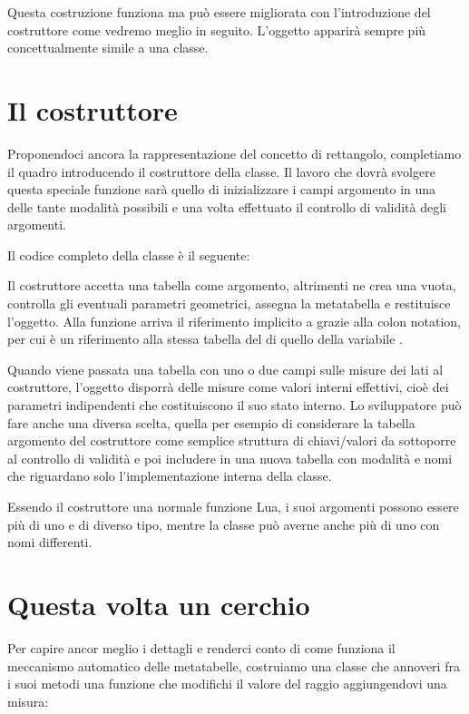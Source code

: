 Questa costruzione funziona ma può essere migliorata con l'introduzione del
costruttore come vedremo meglio in seguito. L'oggetto  apparirà
sempre più concettualmente simile a una classe.


\section{Il costruttore}
\label{iiSecCostruttore}

Proponendoci ancora la rappresentazione del concetto di rettangolo, completiamo
il quadro introducendo il costruttore della classe. Il lavoro che dovrà
svolgere questa speciale funzione sarà quello di inizializzare i campi
argomento in una delle tante modalità possibili e una volta effettuato il
controllo di validità degli argomenti.

Il codice completo della classe  è il seguente:

Il costruttore  accetta una tabella come argomento, altrimenti ne crea
una vuota, controlla gli eventuali parametri geometrici, assegna la metatabella
e restituisce l'oggetto. Alla funzione arriva il riferimento implicito a
 grazie alla colon notation, per cui  è un riferimento
alla stessa tabella del di quello della variabile .

Quando viene passata una tabella con uno o due campi sulle misure dei lati al
costruttore, l'oggetto disporrà delle misure come valori interni effettivi,
cioè dei parametri indipendenti che costituiscono il suo stato interno. Lo
sviluppatore può fare anche una diversa scelta, quella per esempio di
considerare la tabella argomento del costruttore come semplice struttura di
chiavi/valori da sottoporre al controllo di validità e poi includere in una
nuova tabella con modalità e nomi che riguardano solo l'implementazione interna
della classe.

Essendo il costruttore una normale funzione Lua, i suoi argomenti possono essere
più di uno e di diverso tipo, mentre la classe può averne anche più di uno con
nomi differenti.


\section{Questa volta un cerchio}

Per capire ancor meglio i dettagli e renderci conto di come funziona il
meccanismo automatico delle metatabelle, costruiamo una classe  che
annoveri fra i suoi metodi una funzione che modifichi il valore del raggio
aggiungendovi una misura:

